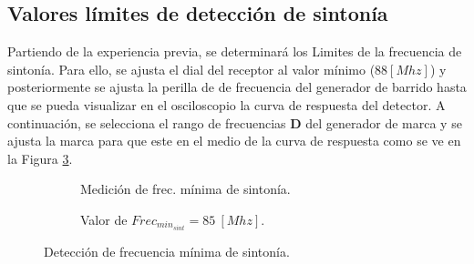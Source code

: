   \subsection{Valores límites de detección de sintonía}

    Partiendo de la experiencia previa, se determinará los Limites de la frecuencia 
    de sintonía. Para ello, se ajusta el dial del receptor al valor mínimo 
    (\(88[Mhz]\)) y posteriormente se ajusta la perilla de de frecuencia del generador 
    de barrido hasta que se pueda visualizar en el osciloscopio la curva de respuesta 
    del detector. A continuación, se selecciona el rango de frecuencias \textbf{D} 
    del generador de marca y se ajusta la marca para que este en el medio de la 
    curva de respuesta como se ve en la Figura \ref{fig:FrecMintSint}.   
      \begin{figure}[H]
        \centering
        \begin{subfigure}[ht]{0.48\textwidth}
          \caption{Medición de frec. mínima de sintonía.}
          \label{fig:FrecMinSintConGen}
        \end{subfigure}
        \hfill 
        \begin{subfigure}[ht]{0.48\textwidth}
          \caption{Valor de  \(Frec_{min_{sint}} = 85~[Mhz]\).}
          \label{fig:FrecMinSintValor}
        \end{subfigure}
        \caption{Detección de frecuencia mínima de sintonía.}
        \label{fig:FrecMintSint}
      \end{figure}

